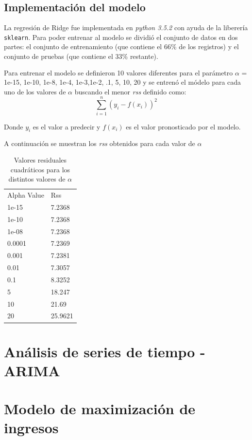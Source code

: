 \subsection*{Implementación del modelo}

La regresión de Ridge fue implementada en \emph{python 3.5.2} con ayuda de la liberería \texttt{sklearn}. Para poder entrenar al modelo se dividió el conjunto de datos en dos partes: el conjunto de entrenamiento (que contiene el 66\% de los registros) y el conjunto de pruebas (que contiene el 33\% restante). 

Para entrenar el modelo se definieron 10 valores diferentes para el parámetro $\alpha$ = 1e-15, 1e-10, 1e-8, 1e-4, 1e-3,1e-2, .1, 5, 10, 20 y se entrenó el módelo para cada uno de los valores de $\alpha$ buscando el menor \emph{rss} definido como: $$\sum_{i=1}^{n}(y_i - f(x_i))^2$$

Donde $y_i$ es el valor a predecir y $f(x_i)$ es el valor pronosticado por el modelo.

A continuación se muestran los \emph{rss} obtenidos para cada valor de $\alpha$

\begin{table}[]
\centering
\begin{tabular}{ll}
Alpha Value & Rss    \\
1e-15       & 7.2368 \\
1e-10       & 7.2368 \\
1e-08       & 7.2368 \\
0.0001      & 7.2369 \\
0.001       & 7.2381 \\
0.01        & 7.3057 \\
0.1         & 8.3252 \\
5           & 18.247 \\
10          & 21.69  \\
20          & 25.9621
\end{tabular}
\caption{Valores residuales cuadráticos para los distintos valores de $\alpha$}
\end{table}

\section*{Análisis de series de tiempo - ARIMA}


\section*{Modelo de maximización de ingresos}

